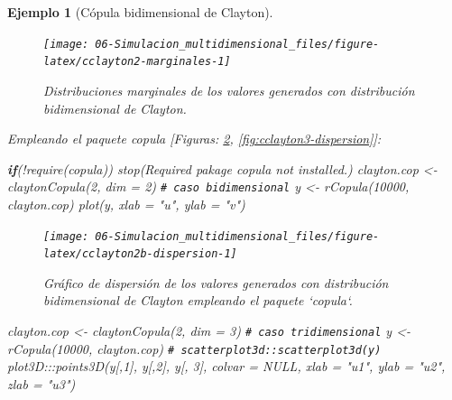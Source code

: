 \documentclass[
]{book}
\newenvironment{Shaded}{\begin{snugshade}}{\end{snugshade}}
\newcommand{\AttributeTok}[1]{\textcolor[rgb]{0.77,0.63,0.00}{#1}}
\newcommand{\CommentTok}[1]{\textcolor[rgb]{0.56,0.35,0.01}{\textit{#1}}}
\newcommand{\ConstantTok}[1]{\textcolor[rgb]{0.00,0.00,0.00}{#1}}
\newcommand{\ControlFlowTok}[1]{\textcolor[rgb]{0.13,0.29,0.53}{\textbf{#1}}}
\newcommand{\DecValTok}[1]{\textcolor[rgb]{0.00,0.00,0.81}{#1}}
\newcommand{\FunctionTok}[1]{\textcolor[rgb]{0.00,0.00,0.00}{#1}}
\newcommand{\NormalTok}[1]{#1}
\newcommand{\OtherTok}[1]{\textcolor[rgb]{0.56,0.35,0.01}{#1}}
\newcommand{\SpecialCharTok}[1]{\textcolor[rgb]{0.00,0.00,0.00}{#1}}
\newcommand{\StringTok}[1]{\textcolor[rgb]{0.31,0.60,0.02}{#1}}
\theoremstyle{break}
\newtheorem{example}{Ejemplo}[chapter]
\theoremstyle{nonumberplain}
\renewcommand{\CommentTok}[1]{\textcolor[rgb]{0.41,0.41,0.41}{\texttt{#1}}}
\begin{document}
\begin{example}[Cópula bidimensional de Clayton]
\begin{figure}[!htb]

{\centering \texttt{[image: 06-Simulacion\_multidimensional\_files/figure-latex/cclayton2-marginales-1]} 

}

\caption{Distribuciones marginales de los valores generados con distribución bidimensional de Clayton.}\label{fig:cclayton2-marginales}
\end{figure}

Empleando el paquete \emph{copula} {[}Figuras: \ref{fig:cclayton2b-dispersion}, \ref{fig:cclayton3-dispersion}{]}:

\begin{Shaded}
\begin{Highlighting}[]
\ControlFlowTok{if}\NormalTok{(}\SpecialCharTok{!}\FunctionTok{require}\NormalTok{(copula)) }\FunctionTok{stop}\NormalTok{(}\StringTok{\textquotesingle{}Required pakage \textasciigrave{}copula\textasciigrave{} not installed.\textquotesingle{}}\NormalTok{)}
\NormalTok{clayton.cop }\OtherTok{\textless{}{-}} \FunctionTok{claytonCopula}\NormalTok{(}\DecValTok{2}\NormalTok{, }\AttributeTok{dim =} \DecValTok{2}\NormalTok{) }\CommentTok{\# caso bidimensional}
\NormalTok{y }\OtherTok{\textless{}{-}} \FunctionTok{rCopula}\NormalTok{(}\DecValTok{10000}\NormalTok{, clayton.cop)}
\FunctionTok{plot}\NormalTok{(y, }\AttributeTok{xlab =} \StringTok{"u"}\NormalTok{, }\AttributeTok{ylab =} \StringTok{"v"}\NormalTok{)}
\end{Highlighting}
\end{Shaded}

\begin{figure}[!htb]

{\centering \texttt{[image: 06-Simulacion\_multidimensional\_files/figure-latex/cclayton2b-dispersion-1]} 

}

\caption{Gráfico de dispersión de los valores generados con distribución bidimensional de Clayton empleando el paquete `copula`.}\label{fig:cclayton2b-dispersion}
\end{figure}



\begin{Shaded}
\begin{Highlighting}[]
\NormalTok{clayton.cop }\OtherTok{\textless{}{-}} \FunctionTok{claytonCopula}\NormalTok{(}\DecValTok{2}\NormalTok{, }\AttributeTok{dim =} \DecValTok{3}\NormalTok{) }\CommentTok{\# caso tridimensional}
\NormalTok{y }\OtherTok{\textless{}{-}} \FunctionTok{rCopula}\NormalTok{(}\DecValTok{10000}\NormalTok{, clayton.cop)}
\CommentTok{\# scatterplot3d::scatterplot3d(y)}
\NormalTok{plot3D}\SpecialCharTok{:::}\FunctionTok{points3D}\NormalTok{(y[,}\DecValTok{1}\NormalTok{], y[,}\DecValTok{2}\NormalTok{], y[, }\DecValTok{3}\NormalTok{], }\AttributeTok{colvar =} \ConstantTok{NULL}\NormalTok{, }
                  \AttributeTok{xlab =} \StringTok{"u1"}\NormalTok{, }\AttributeTok{ylab =} \StringTok{"u2"}\NormalTok{, }\AttributeTok{zlab =} \StringTok{"u3"}\NormalTok{) }
\end{Highlighting}
\end{Shaded}


\end{example}
\end{document}
